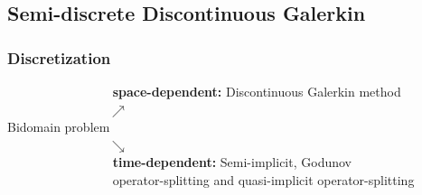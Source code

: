 \documentclass[9pt]{beamer}
\begin{document}
\begin{frame}
\section{Semi-discrete Discontinuous Galerkin}
\frametitle{Discretization}
$\qquad \qquad \qquad \qquad $ \textbf{space-dependent:} Discontinuous Galerkin method\\\vspace{2mm}
$\qquad \qquad \qquad \qquad \nearrow$\\
Bidomain problem\\
$\qquad \qquad \qquad \qquad \searrow$\\\vspace{2mm}
$\qquad \qquad \qquad \qquad $ \textbf{time-dependent:} Semi-implicit, Godunov\\ $\qquad \qquad \qquad \qquad $ operator-splitting and quasi-implicit operator-splitting
\end{frame}
\end{document}
